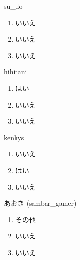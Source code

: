 \begin{prework}{ su\_do }
  \begin{enumerate}
  \item いいえ
  \item いいえ
  \item いいえ
  \end{enumerate}
\end{prework}

\begin{prework}{ hihitani }
  \begin{enumerate}
  \item はい
  \item いいえ
  \item いいえ
  \end{enumerate}
\end{prework}

\begin{prework}{ kenhys }
  \begin{enumerate}
  \item いいえ
  \item はい
  \item いいえ
  \end{enumerate}
\end{prework}

\begin{prework}{ あおき (sambar\_gamer) }
  \begin{enumerate}
  \item その他
  \item いいえ
  \item いいえ
  \end{enumerate}
\end{prework}
